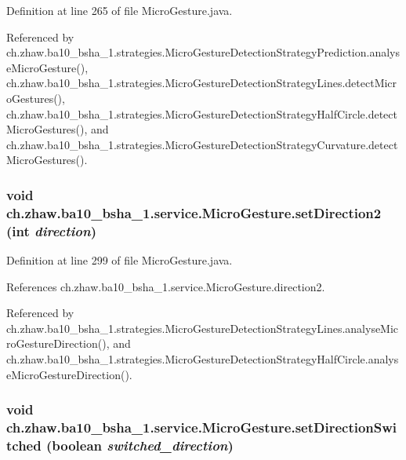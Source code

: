 Definition at line 265 of file MicroGesture.java.

Referenced by ch.zhaw.ba10\_\-bsha\_\-1.strategies.MicroGestureDetectionStrategyPrediction.analyseMicroGesture(), ch.zhaw.ba10\_\-bsha\_\-1.strategies.MicroGestureDetectionStrategyLines.detectMicroGestures(), ch.zhaw.ba10\_\-bsha\_\-1.strategies.MicroGestureDetectionStrategyHalfCircle.detectMicroGestures(), and ch.zhaw.ba10\_\-bsha\_\-1.strategies.MicroGestureDetectionStrategyCurvature.detectMicroGestures().\hypertarget{classch_1_1zhaw_1_1ba10__bsha__1_1_1service_1_1MicroGesture_a0599eb1f4978635f7eed3fa1bb9961dc}{
\subsubsection[{setDirection2}]{\setlength{\rightskip}{0pt plus 5cm}void ch.zhaw.ba10\_\-bsha\_\-1.service.MicroGesture.setDirection2 (int {\em direction})}}
\label{classch_1_1zhaw_1_1ba10__bsha__1_1_1service_1_1MicroGesture_a0599eb1f4978635f7eed3fa1bb9961dc}


Definition at line 299 of file MicroGesture.java.

References ch.zhaw.ba10\_\-bsha\_\-1.service.MicroGesture.direction2.

Referenced by ch.zhaw.ba10\_\-bsha\_\-1.strategies.MicroGestureDetectionStrategyLines.analyseMicroGestureDirection(), and ch.zhaw.ba10\_\-bsha\_\-1.strategies.MicroGestureDetectionStrategyHalfCircle.analyseMicroGestureDirection().\hypertarget{classch_1_1zhaw_1_1ba10__bsha__1_1_1service_1_1MicroGesture_ad4647452ba6cbeca4766bf81dfa0fc7d}{
\subsubsection[{setDirectionSwitched}]{\setlength{\rightskip}{0pt plus 5cm}void ch.zhaw.ba10\_\-bsha\_\-1.service.MicroGesture.setDirectionSwitched (boolean {\em switched\_\-direction})}}
\label{classch_1_1zhaw_1_1ba10__bsha__1_1_1service_1_1MicroGesture_ad4647452ba6cbeca4766bf81dfa0fc7d}


